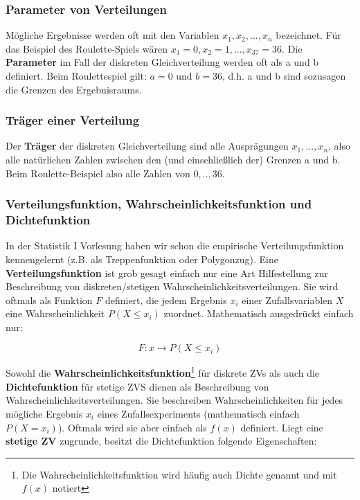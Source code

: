 \documentclass[a4paper]{article}
\begin{document}
\subsubsection{Parameter von Verteilungen}\label{sec:Param}

Mögliche Ergebnisse werden oft mit den Variablen $x_1,x_2,...,x_n$ bezeichnet. Für das Beispiel des Roulette-Spiels wären $x_1=0,x_2=1,...,x_{37}=36$. Die \textbf{Parameter} im Fall der diskreten Gleichverteilung werden oft als a und b definiert. Beim Roulettespiel gilt: $a = 0$ und $b = 36$, d.h. a und b sind sozusagen die Grenzen des Ergebnisraums.

\subsubsection{Träger einer Verteilung} \label{sec:Träger}
Der \textbf{Träger} der diskreten Gleichverteilung sind alle Ausprägungen $x_1,...,x_n$, also alle natürlichen Zahlen zwischen den (und einschließlich der) Grenzen a und b. Beim Roulette-Beispiel also alle Zahlen von $0,..,36$. 

\subsubsection{Verteilungsfunktion, Wahrscheinlichkeitsfunktion und Dichtefunktion} \label{sec:Functions}
In der Statistik I Vorlesung haben wir schon die empirische Verteilungsfunktion kennengelernt (z.B. als Treppenfunktion oder Polygonzug). Eine \textbf{Verteilungsfunktion} ist grob gesagt einfach nur eine Art Hilfestellung zur Beschreibung von diskreten/stetigen Wahrscheinlichkeitsverteilungen. Sie wird oftmals als Funktion $F$ definiert, die jedem Ergebnis $x_i$ einer Zufallsvariablen $X$ eine Wahrscheinlichkeit $P(X \leq x_i)$ zuordnet. Mathematisch ausgedrückt einfach nur:

\begin{equation*}
F: x \rightarrow P(X \leq x_i)
\end{equation*}

 
\noindent Sowohl die \textbf{Wahrscheinlichkeitsfunktion}\footnote{Die Wahrscheinlichkeitsfunktion wird häufig auch Dichte genannt und mit $f(x)$ notiert} für diskrete ZVs als auch die \textbf{Dichtefunktion} für stetige ZVS dienen als Beschreibung von Wahrscheinlichkeitsverteilungen. Sie beschreiben Wahrscheinlichkeiten für jedes mögliche Ergebnis $x_i$ eines Zufallsexperiments (mathematisch einfach $P(X=x_i)$). Oftmals wird sie aber einfach als $f(x)$ definiert. Liegt eine \textbf{stetige ZV} zugrunde, besitzt die Dichtefunktion folgende Eigenschaften:
\end{document}
